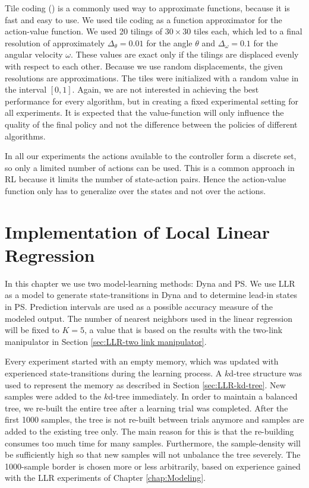 Tile coding () is a commonly used way to approximate functions, because it is fast and easy to use. We used tile coding as a function approximator for the action-value function. We used 20 tilings of $30\times 30$ tiles each, which led to a final resolution of approximately $\Delta_\theta=0.01$ for the angle $\theta$ and $\Delta_\omega=0.1$ for the angular velocity $\omega$. These values are exact only if the tilings are displaced evenly with respect to each other. Because we use random displacements, the given resolutions are approximations. The tiles were initialized with a random value in the interval $[0,1]$. Again, we are not interested in achieving the best performance for every algorithm, but in creating a fixed experimental setting for all experiments. It is expected that the value-function will only influence the quality of the final policy and not the difference between the policies of different algorithms. 

In all our experiments the actions available to the controller form a discrete set, so only a limited number of actions can be used. This is a common approach in \ac{RL} because it limits the number of state-action pairs. Hence the action-value function only has to generalize over the states and not over the actions.




\section{Implementation of Local Linear Regression} \label{sec:PS-LLR implementation}
In this chapter we use two model-learning methods: Dyna and \ac{PS}. We use \ac{LLR} as a model to generate state-transitions in Dyna and to determine lead-in states in \ac{PS}. Prediction intervals are used as a possible accuracy measure of the modeled output. The number of nearest neighbors used in the linear regression will be fixed to $K=5$, a value that is based on the results with the two-link manipulator in Section \ref{sec:LLR-two link manipulator}. 
 
Every experiment started with an empty memory, which was updated with experienced state-transitions during the learning process. A $k$d-tree structure was used to represent the memory as described in Section \ref{sec:LLR-kd-tree}. New samples were added to the $k$d-tree immediately. In order to maintain a balanced tree, we re-built the entire tree after a learning trial was completed. After the first 1000 samples, the tree is not re-built between trials anymore and samples are added to the existing tree only. The main reason for this is that the re-building consumes too much time for many samples. Furthermore, the sample-density will be sufficiently high so that new samples will not unbalance the tree severely. The 1000-sample border is chosen more or less arbitrarily, based on experience gained with the \ac{LLR} experiments of Chapter \ref{chap:Modeling}. 




